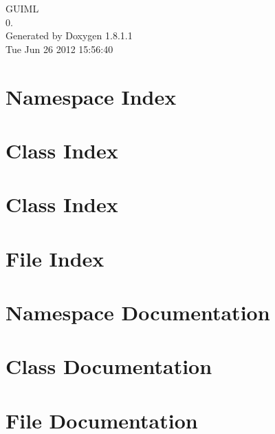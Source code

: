 \documentclass{book}
\begin{document}
\begin{titlepage}
\vspace*{7cm}
\begin{center}
{\Large G\-U\-I\-M\-L \\[1ex]\large 0. }\\
\vspace*{1cm}
{\large Generated by Doxygen 1.8.1.1}\\
\vspace*{0.5cm}
{\small Tue Jun 26 2012 15:56:40}\\
\end{center}
\end{titlepage}
\clearemptydoublepage
{}
\tableofcontents
\clearemptydoublepage
{}
\chapter{Namespace Index}

\chapter{Class Index}

\chapter{Class Index}

\chapter{File Index}

\chapter{Namespace Documentation}

\chapter{Class Documentation}




























\chapter{File Documentation}



\printindex
\end{document}
